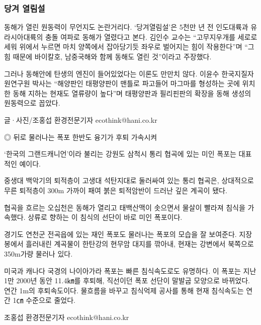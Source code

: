 \documentclass[12pt,a4paper]{book}
\newcommand{\SectionMargin}			{\newpage  \null \vskip 0cm}
\newcommand{\SubSectionMargin}		{\newpage  \null \vskip 0cm}
\begin{document}
		\subsubsection{당겨 열림설}

		동해가 열린 원동력이 무언지도 논란거리다. 
		‘당겨열림설’은 5천만 년 전 인도대륙과 유라시아대륙의 충돌 여파로 동해가 열렸다고 본다. 
		김인수 교수는 “고무지우개를 세로로 세워 위에서 누르면 마치 양쪽에서 잡아당기듯 좌우로 벌어지는 힘이 작용한다”며 
		“그 힘 때문에 바이칼호, 남중국해와 함께 동해도 열린 것”이라고 주장했다.
 

		그러나 동해안에 탄생의 엔진이 들어있었다는 이론도 만만치 않다. 
		이윤수 한국지질자원연구원 박사는 “해양판인 태평양판이 맨틀로 파고들어 마그마를 형성하는 곳에 위치한 동해 지하는 현재도 열류량이 높다”며 
		태평양판과 필리핀판의 확장을 동해 생성의 원동력으로 꼽았다.  
 


		글·사진/조홍섭 환경전문기자 ecothink@hani.co.kr



 
		\SubSectionMargin

		◎ 뒤로 물러나는 폭포
		한반도 융기가 후퇴 가속시켜
		 
		‘한국의 그랜드캐니언’이라 불리는 강원도 삼척시 통리 협곡에 있는 미인 폭포는 대표적인 예이다.
		 
		중생대 백악기의 퇴적층이 고생대 석탄지대로 둘러싸여 있는 통리 협곡은, 
		상대적으로 무른 퇴적층이 300m 가까이 패여 붉은 퇴적암반이 드러난 깊은 계곡이 됐다.
		 
		협곡을 흐르는 오십천은 동해가 열리고 태백산맥이 솟으면서 물살이 빨라져 침식을 가속했다. 
		상류로 향하는 이 침식의 선단이 바로 미인 폭포이다.
		 
		경기도 연천군 전곡읍에 있는 재인 폭포도 물러나는 폭포의 모습을 잘 보여준다. 
		지장봉에서 흘러내린 계곡물이 한탄강의 현무암 대지를 깎아내, 현재는 강변에서 북쪽으로 350m가량 물러나 있다.
		 
		미국과 캐나다 국경의 나이아가라 폭포는 빠른 침식속도로도 유명하다. 
		이 폭포는 지난 1만 2000년 동안 11.4㎞를 후퇴해, 직선이던 폭포 선단이 말발굽 모양으로 바뀌었다. 
		연간 1m의 후퇴속도이다. 
		물흐름을 바꾸고 침식억제 공사를 통해 현재 침식속도는 연간 1㎝ 수준으로 줄었다. 
		 
		조홍섭 환경전문기자 ecothink@hani.co.kr









	\SectionMargin
\end{document}

